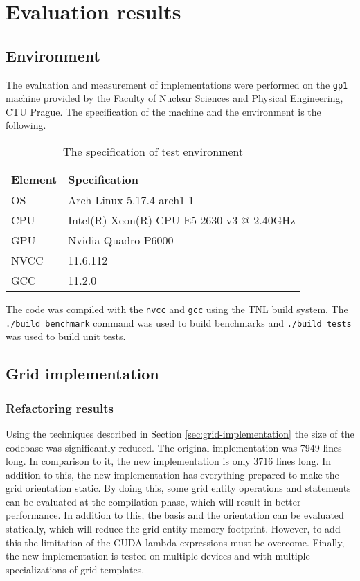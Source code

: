 
\chapter{Evaluation results}

\section{Environment}

The evaluation and measurement of implementations were performed on the \texttt{gp1} machine provided by the Faculty of Nuclear Sciences and Physical Engineering, CTU Prague.
The specification of the machine and the environment is the following.

\begin{table}[!h]
\begin{tabularx}{\textwidth}{l|Y}
\textbf{Element} & \textbf{Specification} \\
\hline \hline
OS & Arch Linux 5.17.4-arch1-1 \\
CPU & Intel(R) Xeon(R) CPU E5-2630 v3 @ 2.40GHz \\
GPU & Nvidia Quadro P6000 \\
NVCC & 11.6.112 \\
GCC & 11.2.0
\end{tabularx}
\caption{The specification of test environment}
\end{table}

The code was compiled with the \texttt{nvcc} and \texttt{gcc} using the TNL build system.
The \texttt{./build benchmark} command was used to build benchmarks and \texttt{./build tests} was used to build unit tests.

\section{Grid implementation}

\subsection{Refactoring results}

Using the techniques described in Section \ref{sec:grid-implementation} the size of the codebase was significantly reduced.
The original implementation was 7949 lines long.
In comparison to it, the new implementation is only 3716 lines long.
In addition to this, the new implementation has everything prepared to make the grid orientation static.
By doing this, some grid entity operations and statements can be evaluated at the compilation phase, which will result in better performance.
In addition to this, the basis and the orientation can be evaluated statically, which will reduce the grid entity memory footprint.
However, to add this the limitation of the CUDA lambda expressions must be overcome.
Finally, the new implementation is tested on multiple devices and with multiple specializations of grid templates.

